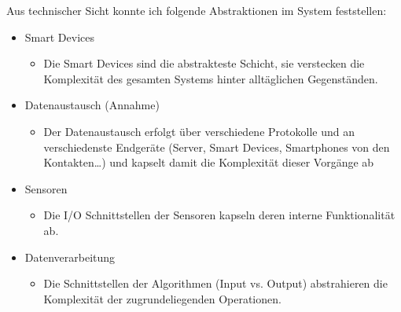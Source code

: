 Aus technischer Sicht konnte ich folgende Abstraktionen im System feststellen:
\begin{itemize}
	\item Smart Devices 
	\begin{itemize}
		\item Die Smart Devices sind die abstrakteste Schicht, sie verstecken die Komplexität des gesamten Systems hinter alltäglichen Gegenständen. 
	\end{itemize}

	\item Datenaustausch (Annahme)
	\begin{itemize}
		\item Der Datenaustausch erfolgt über verschiedene Protokolle und an verschiedenste Endgeräte (Server, Smart Devices, Smartphones von den Kontakten\dots ) und kapselt damit die Komplexität dieser Vorgänge ab
	\end{itemize}

	\item Sensoren
	\begin{itemize}
		\item Die I/O Schnittstellen der Sensoren kapseln deren interne Funktionalität ab. 
	\end{itemize}

	\item Datenverarbeitung
	\begin{itemize}
		\item Die Schnittstellen der Algorithmen (Input vs. Output) abstrahieren die Komplexität der zugrundeliegenden Operationen.
	\end{itemize}
\end{itemize}

